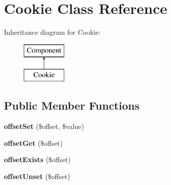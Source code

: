 \hypertarget{classCookie}{
\section{Cookie Class Reference}
\label{classCookie}
}
Inheritance diagram for Cookie:\begin{figure}[H]
\begin{center}
\leavevmode
\includegraphics[height=2.000000cm]{classCookie}
\end{center}
\end{figure}
\subsection*{Public Member Functions}
\begin{DoxyCompactItemize}
\item 
\hypertarget{classCookie_a2d6eea6280981d7ab703772681f7a4aa}{
{\bfseries offsetSet} (\$offset, \$value)}
\label{classCookie_a2d6eea6280981d7ab703772681f7a4aa}

\item 
\hypertarget{classCookie_a17b6835c4e468e34741bd9ad4fa87fb5}{
{\bfseries offsetGet} (\$offset)}
\label{classCookie_a17b6835c4e468e34741bd9ad4fa87fb5}

\item 
\hypertarget{classCookie_aa473c0ae3cb07717be9b5b00aa59fe29}{
{\bfseries offsetExists} (\$offset)}
\label{classCookie_aa473c0ae3cb07717be9b5b00aa59fe29}

\item 
\hypertarget{classCookie_a076e18a6028d8cd5843060893e04e041}{
{\bfseries offsetUnset} (\$offset)}
\label{classCookie_a076e18a6028d8cd5843060893e04e041}

\end{DoxyCompactItemize}
